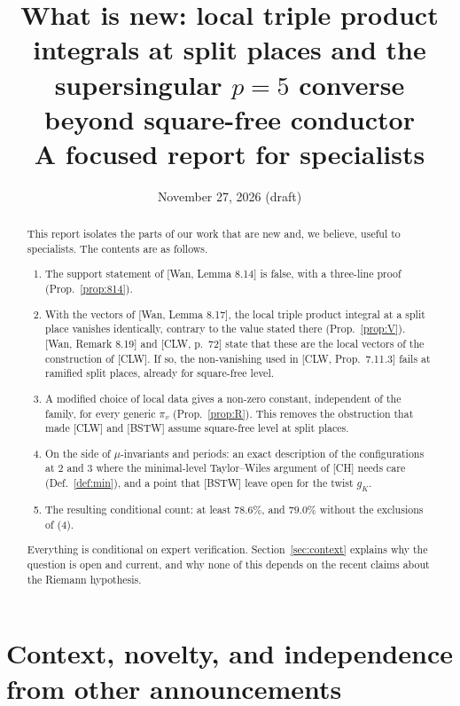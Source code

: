 \documentclass[11pt]{amsart}
\title[New results at split places and beyond square-free level]{What is new: local triple product integrals at split places and the supersingular $p=5$ converse beyond square-free conductor\\[4pt]\normalfont\small A focused report for specialists}
\date{November 27, 2026 (draft)}
\theoremstyle{definition}
\theoremstyle{remark}
\begin{document}
\begin{abstract}
This report isolates the parts of our work that are new and, we believe, useful to specialists. The contents are as follows.
\begin{enumerate}
\item The support statement of [Wan, Lemma 8.14] is false, with a three-line proof (Prop.~\ref{prop:814}).
\item With the vectors of [Wan, Lemma 8.17], the local triple product integral at a split place vanishes identically, contrary to the value stated there (Prop.~\ref{prop:V}). [Wan, Remark 8.19] and [CLW, p.~72] state that these are the local vectors of the construction of [CLW]. If so, the non-vanishing used in [CLW, Prop.~7.11.3] fails at ramified split places, already for square-free level.
\item A modified choice of local data gives a non-zero constant, independent of the family, for every generic $\pi_v$ (Prop.~\ref{prop:R}). This removes the obstruction that made [CLW] and [BSTW] assume square-free level at split places.
\item On the side of $\mu$-invariants and periods: an exact description of the configurations at $2$ and $3$ where the minimal-level Taylor--Wiles argument of [CH] needs care (Def.~\ref{def:min}), and a point that [BSTW] leave open for the twist $g_K$.
\item The resulting conditional count: at least $78.6\%$, and $79.0\%$ without the exclusions of (4).
\end{enumerate}
Everything is conditional on expert verification. Section~\ref{sec:context} explains why the question is open and current, and why none of this depends on the recent claims about the Riemann hypothesis.
\end{abstract}

\maketitle
\tableofcontents

\section{Context, novelty, and independence from other announcements}\label{sec:context}
\end{document}
